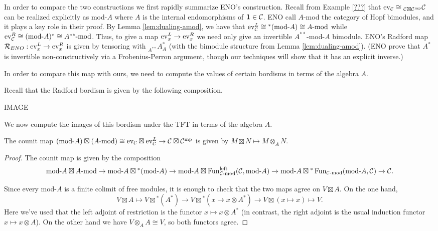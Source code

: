 \documentclass{amsart}
\begin{document}
In order to compare the two constructions we first rapidly summarize ENO's construction.  Recall from Example \ref{???} that $\mathrm{ev}_\mathcal C \cong {}_{\mathcal C \boxtimes \mathcal C^{\mathrm{mp}}}\mathcal C$ can be realized explicitly as mod-$A$ where $A$ is the internal endomorphisms of $\mathbf{1} \in \mathcal C$. 
ENO call $A$-mod the category of Hopf bimodules, and it plays a key role in their proof.  By Lemma \ref{lem:dualing-amod}, we have that $\mathrm{ev}_\mathcal C^L \cong {}^*(\text{mod-}A) \cong A\text{-mod}$ while $\mathrm{ev}_\mathcal C^R \cong (\text{mod-}A)^* \cong A^{**}\text{-mod}$.  Thus, to give a map $\mathrm{ev}_x^L \rightarrow \mathrm{ev}_x^R$ we need only give an invertible $A^{**}$-mod-$A$ bimodule.  ENO's Radford map $\mathcal R_{ENO}: \mathrm{ev}_x^L \rightarrow \mathrm{ev}_x^R$ is given by tensoring with ${}_{A^{**}}A^*_A$ (with the bimodule structure from Lemma \ref{lem:dualing-amod}).  (ENO prove that $A^*$ is invertible non-constructively via a Frobenius-Perron argument, though our techniques will show that it has an explicit inverse.)


In order to compare this map with ours, we need to compute the values of certain bordisms in terms of the algebra $A$.

Recall that the Radford bordism is given by the following composition.

IMAGE

We now compute the images of this bordism under the TFT in terms of the algebra $A$.

\begin{lemma}
The counit map $(\text{mod-}A) \boxtimes (A\text{-mod}) \cong \mathrm{ev}_\mathcal C \boxtimes \mathrm{ev}_\mathcal C^L \rightarrow \mathcal C \boxtimes \mathcal C^{\mathrm{mp}}$ is given by $M \boxtimes N \mapsto M \otimes_A N$.
\end{lemma}
\begin{proof}
The counit map is given by the composition 
$$\text{mod-}A \boxtimes A\text{-mod} \rightarrow \text{mod-}A \boxtimes {}^*(\text{mod-}A) \rightarrow \text{mod-}A \boxtimes \operatorname{Fun}_{\mathcal C\text{-mod}}^{\text{left}}(\mathcal C, \text{mod-}A) \rightarrow \text{mod-}A \boxtimes {}^*\operatorname{Fun}_{\mathcal C\text{-mod}}(\text{mod-}A, \mathcal C) \rightarrow \mathcal C.$$

Since every mod-$A$ is a finite colimit of free modules, it is enough to check that the two maps agree on $V \boxtimes A$.  On the one hand,
$$V \boxtimes A \mapsto V \boxtimes {}^*(A^*) \rightarrow V \boxtimes {}^*(x \mapsto x \otimes A^*) \rightarrow V \boxtimes (x \mapsto x) \mapsto V.$$  Here we've used that the left adjoint of restriction is the functor $x \mapsto x \otimes A^*$ (in contrast, the right adjoint is the usual induction functor $x \mapsto x \otimes A$).  On the other hand we have $V \otimes_A A \cong V$, so both functors agree.
\end{proof}
\end{document}
